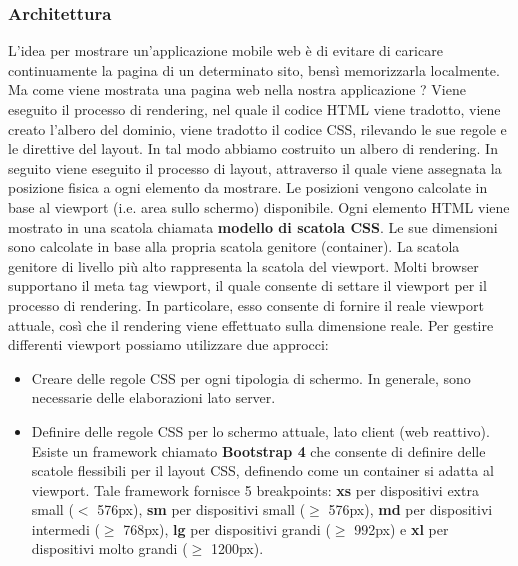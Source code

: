 \subsubsection{Architettura}
L'idea per mostrare un'applicazione mobile web è di evitare di caricare continuamente la pagina di un determinato sito, bensì memorizzarla localmente. Ma come viene mostrata una pagina web nella nostra applicazione ? Viene eseguito il processo di rendering, nel quale il codice HTML viene tradotto, viene creato l'albero del dominio, viene tradotto il codice CSS, rilevando le sue regole e le direttive del layout. In tal modo abbiamo costruito un albero di rendering. In seguito viene eseguito il processo di layout, attraverso il quale viene assegnata la posizione fisica a ogni elemento da mostrare. Le posizioni vengono calcolate in base al viewport (i.e. area sullo schermo) disponibile. Ogni elemento HTML viene mostrato in una scatola chiamata \textbf{modello di scatola CSS}. Le sue dimensioni sono calcolate in base alla propria scatola genitore (container). La scatola genitore di livello più alto rappresenta la scatola del viewport. Molti browser supportano il meta tag viewport, il quale consente di settare il viewport per il processo di rendering. In particolare, esso consente di fornire il reale viewport attuale, così che il rendering viene effettuato sulla dimensione reale. Per gestire differenti viewport possiamo utilizzare due approcci:
\begin{itemize}
    \item Creare delle regole CSS per ogni tipologia di schermo. In generale, sono necessarie delle elaborazioni lato server.
    \item Definire delle regole CSS per lo schermo attuale, lato client (web reattivo). Esiste un framework chiamato \textbf{Bootstrap 4} che consente di definire delle scatole flessibili per il layout CSS, definendo come un container si adatta al viewport. Tale framework fornisce 5 breakpoints: \textbf{xs} per dispositivi extra small ($<$ 576px), \textbf{sm} per dispositivi small ($\geq$ 576px), \textbf{md} per dispositivi intermedi ($\geq$ 768px), \textbf{lg} per dispositivi grandi ($\geq$ 992px) e \textbf{xl} per dispositivi molto grandi ($\geq$ 1200px).
\end{itemize}

